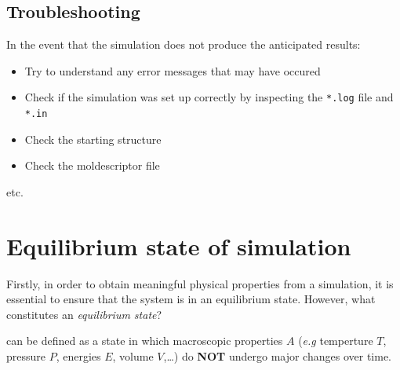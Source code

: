 \documentclass[
  letterpaper,
]{article}
\begin{document}
\hypertarget{troubleshooting}{%
\subsection*{Troubleshooting}\label{troubleshooting}}


In the event that the simulation does not produce the anticipated
results:

\begin{itemize}
\item[$\square$]
  Try to understand any error messages that may have occured
\item[$\square$]
  Check if the simulation was set up correctly by inspecting the
  \texttt{*.log} file and \texttt{*.in}
\item[$\square$]
  Check the starting structure
\item[$\square$]
  Check the moldescriptor file
\end{itemize}

etc.

\hypertarget{equilibrium-state-of-simulation}{%
\section*{Equilibrium state of
simulation}\label{equilibrium-state-of-simulation}}


Firstly, in order to obtain meaningful physical properties from a
simulation, it is essential to ensure that the system is in an
equilibrium state. However, what constitutes an \emph{equilibrium
state}?

\begin{tcolorbox}[enhanced jigsaw, opacitybacktitle=0.6, colback=white, rightrule=.15mm, bottomrule=.15mm, coltitle=black, toprule=.15mm, bottomtitle=1mm, arc=.35mm, colframe=quarto-callout-important-color-frame, opacityback=0, toptitle=1mm, breakable, titlerule=0mm, left=2mm, title=\textcolor{quarto-callout-important-color}{\faExclamation}\hspace{0.5em}{An equilibrium state:}, leftrule=.75mm, colbacktitle=quarto-callout-important-color!10!white]

can be defined as a state in which macroscopic properties \(A\)
(\emph{e.g} temperture \(T\), pressure \(P\), energies \(E\), volume
\(V\),\ldots) do \textbf{NOT} undergo major changes over time.

\end{tcolorbox}
\end{document}
